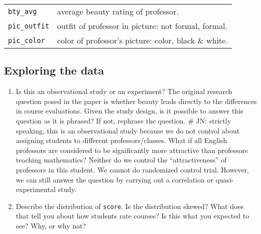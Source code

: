 \documentclass[]{article}
\begin{document}
\begin{longtable}[]{@{}ll@{}}
\begin{minipage}[t]{0.22\columnwidth}
\texttt{bty\_avg}\strut
\end{minipage} & \begin{minipage}[t]{0.16\columnwidth}\raggedright\strut
average beauty rating of professor.\strut
\end{minipage}\tabularnewline
\begin{minipage}[t]{0.22\columnwidth}\raggedright\strut
\texttt{pic\_outfit}\strut
\end{minipage} & \begin{minipage}[t]{0.16\columnwidth}\raggedright\strut
outfit of professor in picture: not formal, formal.\strut
\end{minipage}\tabularnewline
\begin{minipage}[t]{0.22\columnwidth}\raggedright\strut
\texttt{pic\_color}\strut
\end{minipage} & \begin{minipage}[t]{0.16\columnwidth}\raggedright\strut
color of professor's picture: color, black \& white.\strut
\end{minipage}\tabularnewline
\bottomrule
\end{longtable}

\subsection{Exploring the data}\label{exploring-the-data}

\begin{enumerate}
\def\labelenumi{\arabic{enumi}.}
\item
  Is this an observational study or an experiment? The original research
  question posed in the paper is whether beauty leads directly to the
  differences in course evaluations. Given the study design, is it
  possible to answer this question as it is phrased? If not, rephrase
  the question. \# JN: strictly speaking, this is an observational study
  because we do not control about assigning students to different
  professors/classes. What if all English professors are considered to
  be significantly more attractive than professors teaching mathematics?
  Neither do we control the ``attractiveness'' of professors in this
  student. We cannot do randomized control trial. However, we can still
  answer the question by carrying out a correlation or
  quasi-experimental study.
\item
  Describe the distribution of \texttt{score}. Is the distribution
  skewed? What does that tell you about how students rate courses? Is
  this what you expected to see? Why, or why not?
\end{enumerate}
\end{document}
